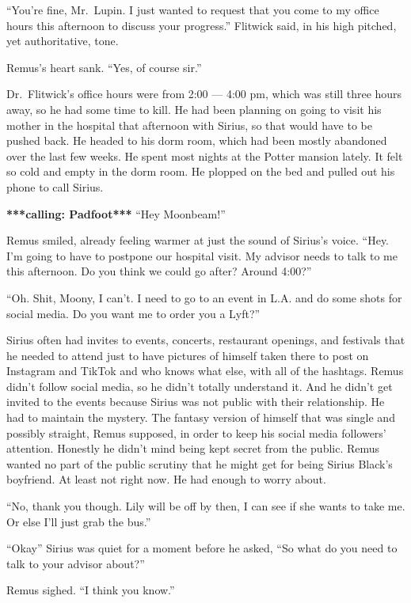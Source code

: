 \documentclass[12pt,twoside,openright]{memoir}
\begin{document}
``You're fine, Mr.\ Lupin. I just wanted to request that you come to my office hours this afternoon to discuss your progress.'' Flitwick said, in his high pitched, yet authoritative, tone. 

Remus's heart sank. ``Yes, of course sir.''

Dr.\ Flitwick's office hours were from 2:00 --- 4:00 pm, which was still three hours away, so he had some time to kill. He had been planning on going to visit his mother in the hospital that afternoon with Sirius, so that would have to be pushed back. He headed to his dorm room, which had been mostly abandoned over the last few weeks. He spent most nights at the Potter mansion lately. It felt so cold and empty in the dorm room. He plopped on the bed and pulled out his phone to call Sirius.

\textbf{***calling: Padfoot***}\newline
``Hey Moonbeam!''

Remus smiled, already feeling warmer at just the sound of Sirius's voice. ``Hey. I'm going to have to postpone our hospital visit. My advisor needs to talk to me this afternoon. Do you think we could go after? Around 4:00?''

``Oh. Shit, Moony, I can't. I need to go to an event in L.A. and do some shots for social media. Do you want me to order you a Lyft?'' 

Sirius often had invites to events, concerts, restaurant openings, and festivals that he needed to attend just to have pictures of himself taken there to post on Instagram and TikTok and who knows what else, with all of the hashtags. Remus didn't follow social media, so he didn't totally understand it. And he didn't get invited to the events because Sirius was not public with their relationship. He had to maintain the mystery. The fantasy version of himself that was single and possibly straight, Remus supposed, in order to keep his social media followers' attention. Honestly he didn't mind being kept secret from the public. Remus wanted no part of the public scrutiny that he might get for being Sirius Black's boyfriend. At least not right now. He had enough to worry about. 

``No, thank you though. Lily will be off by then, I can see if she wants to take me. Or else I'll just grab the bus.''

``Okay'' Sirius was quiet for a moment before he asked, ``So what do you need to talk to your advisor about?''

Remus sighed. ``I think you know.''
\end{document}
